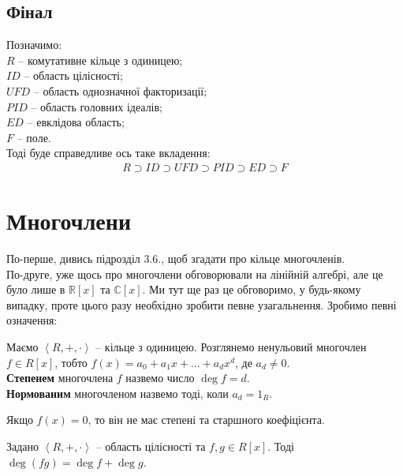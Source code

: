 \documentclass{math_library}
\begin{document}
\subsection*{Фінал}
Позначимо: \\
$R$ -- комутативне кільце з одиницею; \\
$ID$ -- область цілісності; \\
$UFD$ -- область однозначної факторизації; \\
$PID$ -- область головних ідеалів; \\
$ED$ -- евклідова область; \\
$F$ -- поле.\\
Тоді буде справедливе ось таке вкладення:
\begin{align*}
R \supset ID \supset UFD \supset PID \supset ED \supset F
\end{align*}

\newpage


\section{Многочлени}
По-перше, дивись підрозділ 3.6., щоб згадати про кільце многочленів.\\
По-друге, уже щось про многочлени обговорювали на лінійній алгебрі, але це було лише в $\mathbb{R}[x]$ та $\mathbb{C}[x]$. Ми тут ще раз це обговоримо, у будь-якому випадку, проте цього разу необхідно зробити певне узагальнення. Зробимо певні означення:

\begin{definition}
Маємо $\left< R,+,\cdot\right>$ -- кільце з одиницею. Розглянемо ненульовий многочлен $f \in R[x]$, тобто $f(x) = a_0 + a_1 x + \dots + a_d x^d$, де $a_d \neq 0$.\\
\textbf{Степенем} многочлена $f$ назвемо число $\deg f = d$.\\
\textbf{Нормованим} многочленом назвемо тоді, коли $a_d = 1_R$.
\end{definition}

\begin{remark}
Якщо $f(x) = 0$, то він не має степені та старшного коефіцієнта.
\end{remark}

\begin{proposition}
Задано $\left<R,+,\cdot\right>$ -- область цілісності та $f,g \in R[x]$. Тоді $\deg (fg) = \deg f + \deg g$.
\end{proposition}
\end{document}
